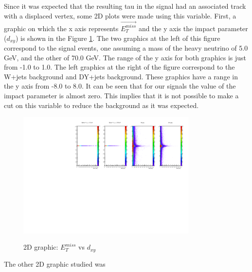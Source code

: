 Since it was expected that the resulting tau in the signal had an associated track with a displaced vertex, some 2D plots were made using this variable. First, a graphic on which the x axis 
represents $\vec{E_T^{miss}}$ and the y axis the impact parameter ($d_{xy}$) is shown in the Figure \ref{ipt1_MET}. The two graphics at the left of this figure correspond to the signal events, one 
assuming a mass of the heavy neutrino of 5.0 GeV, and the other of 70.0 GeV. The range of the y axis for both graphics is just from -1.0 to 1.0. The left graphics at the right of the figure correspond 
to the W+jets background and DY+jets background. These graphics have a range in the y axis from -8.0 to 8.0. It can be seen that for our signals the value of the impact parameter is almost zero. 
This implies that it is not possible to make a cut on this variable to reduce the background as it was expected. 
 
 \begin{figure}[h] 
 \centering
 \caption{2D graphic: $E_T^{miss}$ vs $d_{xy}$}
 \includegraphics[width=0.8\textwidth]{./Capitulos/Analysis/c1} 
 \label{ipt1_MET}
 \end{figure}
 
 The other 2D graphic studied was 
 
 
 
 